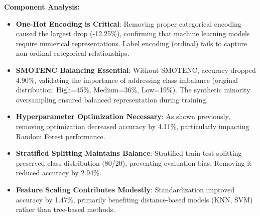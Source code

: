 \begin{table}[htbp]
\centering
\caption{Component Ablation Study: Impact of Removing Pipeline Components}
\label{tab:component_ablation}
\setlength{\tabcolsep}{3pt}
\end{table}

\textbf{Component Analysis:}

\begin{itemize}
    \item \textbf{One-Hot Encoding is Critical}: Removing proper categorical encoding caused the largest drop (-12.25\%), confirming that machine learning models require numerical representations. Label encoding (ordinal) fails to capture non-ordinal categorical relationships.
    
    \item \textbf{SMOTENC Balancing Essential}: Without SMOTENC, accuracy dropped 4.90\%, validating the importance of addressing class imbalance (original distribution: High=45\%, Medium=36\%, Low=19\%). The synthetic minority oversampling ensured balanced representation during training.
    
    \item \textbf{Hyperparameter Optimization Necessary}: As shown previously, removing optimization decreased accuracy by 4.11\%, particularly impacting Random Forest performance.
    
    \item \textbf{Stratified Splitting Maintains Balance}: Stratified train-test splitting preserved class distribution (80/20), preventing evaluation bias. Removing it reduced accuracy by 2.94\%.
    
    \item \textbf{Feature Scaling Contributes Modestly}: Standardization improved accuracy by 1.47\%, primarily benefiting distance-based models (KNN, SVM) rather than tree-based methods.
\end{itemize}

